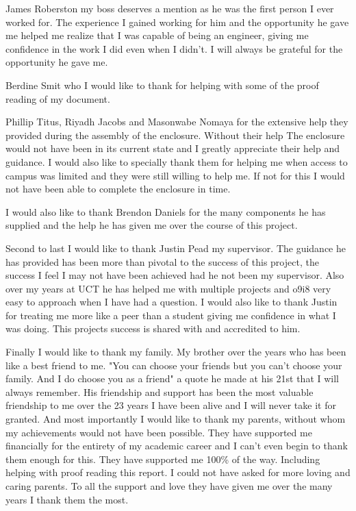 \documentclass[a4paper,11pt]{article}
\numberwithin{figure}{section}
\numberwithin{table}{section}
\begin{document}
	James Roberston my boss deserves a mention as he was the first person I ever worked for. The experience I gained working for him and the opportunity he gave me helped me realize that I was capable of being an engineer, giving me confidence in the work I did even when I didn't. I will always be grateful for the opportunity he gave me.
	
	Berdine Smit who I would like to thank for helping with some of the proof reading of my document. %
	
	Phillip Titus, Riyadh Jacobs and Masonwabe Nomaya for the extensive help they provided during the assembly of the enclosure. Without their help The enclosure would not have been in its current state and I greatly appreciate their help and guidance. I would also like to specially thank them for helping me when access to campus was limited and they were still willing to help me. If not for this I would not have been able to complete the enclosure in time.
	
	I would also like to thank Brendon Daniels for the many components he has supplied and the help he has given me over the course of this project.
	
	Second to last I would like to thank Justin Pead my supervisor. The guidance he has provided has been more than pivotal to the success of this project, the success I feel I may not have been achieved had he not been my supervisor. Also over my years at UCT he has helped me with multiple projects and o9i8 very easy to approach when I have had a question. I would also like to thank Justin for treating me more like a peer than a student giving me confidence in what I was doing. This projects success is shared with and accredited to him.

	Finally I would like to thank my family. My brother over the years who has been like a best friend to me. "You can choose your friends but you can't choose your family. And I do choose you as a friend" a quote he made at his 21st that I will always remember. His friendship and support has been the most valuable friendship to me over the 23 years I have been alive and I will never take it for granted. And most importantly I would like to thank my parents, without whom my achievements would not have been possible. They have supported me financially for the entirety of my academic career and I can't even begin to thank them enough for this. They have supported me 100\% of the way. Including helping with proof reading this report. I could not have asked for more loving and caring parents. To all the support and love they have given me over the many years I thank them the most.
	\newpage
	
\end{document}
